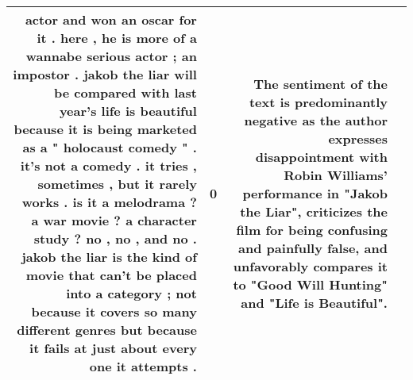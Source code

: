 \begin{tabular}{r{1cm} p{0.4in} r{1cm} p{0.4in}}
actor and won an oscar for it .  here , he is more of a wannabe serious actor ; an impostor .  jakob the liar will be compared with last year's life is beautiful because it is being marketed as a " holocaust comedy " .  it's not a comedy .  it tries , sometimes , but it rarely works .  is it a melodrama ?  a war movie ?  a character study ?  no , no , and no .  jakob the liar is the kind of movie that can't be placed into a category ; not because it covers so many different genres but because it fails at just about every one it attempts .   & 0 & The sentiment of the text is predominantly negative as the author expresses disappointment with Robin Williams' performance in "Jakob the Liar", criticizes the film for being confusing and painfully false, and unfavorably compares it to "Good Will Hunting" and "Life is Beautiful". \\
\bottomrule
\end{tabular}
